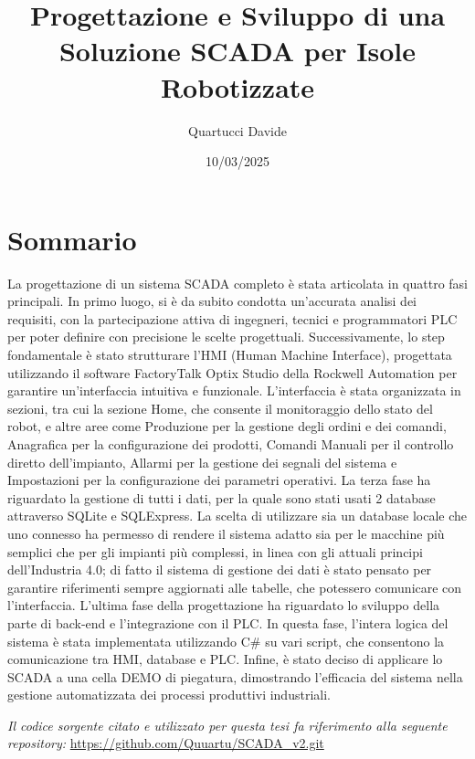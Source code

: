 \documentclass[12pt,a4paper,twoside,openright]{extreport}
\title{Progettazione e Sviluppo di una Soluzione SCADA per Isole Robotizzate}
\author{Quartucci Davide}
\date{10/03/2025}
\begin{document}
    \pagestyle{empty}                           %

    
    \cleardoublepage
    
    
    \cleardoublepage

    \pagestyle{plain}                           %

    \chapter*{Sommario}
    La progettazione di un sistema SCADA completo è stata articolata in quattro fasi principali. In primo luogo, si è da subito condotta un'accurata analisi dei requisiti, con la partecipazione attiva di ingegneri, tecnici e programmatori PLC per poter definire con precisione le scelte progettuali. Successivamente, lo step fondamentale è stato strutturare l’HMI (Human Machine Interface), progettata utilizzando il software FactoryTalk Optix Studio della Rockwell Automation per garantire un'interfaccia intuitiva e funzionale. L'interfaccia è stata organizzata in sezioni, tra cui la sezione Home, che consente il monitoraggio dello stato del robot, e altre aree come Produzione per la gestione degli ordini e dei comandi, Anagrafica per la configurazione dei prodotti, Comandi Manuali per il controllo diretto dell'impianto, Allarmi per la gestione dei segnali del sistema e Impostazioni per la configurazione dei parametri operativi. La terza fase ha riguardato la gestione di tutti i dati, per la quale sono stati usati 2 database attraverso SQLite e SQLExpress. La scelta di utilizzare sia un database locale che uno connesso ha permesso di rendere il sistema adatto sia per le macchine più semplici che per gli impianti più complessi, in linea con gli attuali principi dell'Industria 4.0; di fatto il sistema di gestione dei dati è stato pensato per garantire riferimenti sempre aggiornati alle tabelle, che potessero comunicare con l'interfaccia. L'ultima fase della progettazione ha riguardato lo sviluppo della parte di back-end e l'integrazione con il PLC. In questa fase, l'intera logica del sistema è stata implementata utilizzando C\# su vari script, che consentono la comunicazione tra HMI, database e PLC. Infine, è stato deciso di applicare lo SCADA a una cella DEMO di piegatura, dimostrando l'efficacia del sistema nella gestione automatizzata dei processi produttivi industriali. 
    \begin{flushright}
        \textit{Il codice sorgente citato e utilizzato per questa tesi fa riferimento alla seguente repository:} \url{https://github.com/Quuartu/SCADA_v2.git}    
    \end{flushright}
    
\end{document}
